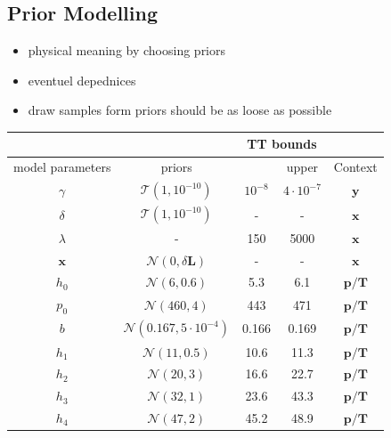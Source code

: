 \subsection{Prior Modelling}
\begin{itemize}
	\item physical meaning by choosing priors
	\item eventuel depednices
	\item draw samples form priors should be as loose as possible
\end{itemize}
\begin{table}
	\centering
	\begin{tabular}{ |c||c|c|c|c|   }
		\hline
		& &\multicolumn{2}{|c|}{TT bounds}&\\
		\hline
		model parameters& priors&\makecell{lower}& \makecell{upper\\
		}&Context\\
		\hhline{|=||=|=|=|=|}
		$\gamma$ & $\mathcal{T}(1,10^{-10})$ &$10^{-8}$ &$4 \cdot 10^{-7}$& $\bm{y}$\\ \hline
		$\delta$ &$\mathcal{T}(1,10^{-10})$ & -&-& $\bm{x}$\\ \hline
		$\lambda$ &- & 150&5000& $\bm{x}$\\ \hline
		$\bm{x}$ &$\mathcal{N}(0,\delta \bm{L})$ & -&-& $\bm{x}$\\ \hhline{|=||=|=|=|=|}
		$h_0$ &  $\mathcal{N}(6,0.6)$& 5.3&6.1&$\bm{p/T}$\\ \hline
		$p_0$ &  $\mathcal{N}(460,4)$&443 &471&$\bm{p/T}$\\ \hline
		$b$ &  $\mathcal{N}(0.167,5 \cdot 10^{-4})$& 0.166& 0.169 &$\bm{p/T}$\\ \hline
		$h_{1}$ &  $\mathcal{N}(11,0.5)$&10.6 &11.3&$\bm{p/T}$\\ \hline
		$h_{2}$ &  $\mathcal{N}(20,3)$&16.6 &22.7&$\bm{p/T}$\\ \hline
		$h_{3}$ &  $\mathcal{N}(32,1)$&23.6 &43.3&$\bm{p/T}$\\ \hline
		$h_{4}$ &  $\mathcal{N}(47,2)$&45.2 &48.9&$\bm{p/T}$\\ \hline

\end{tabular}
\end{table}
